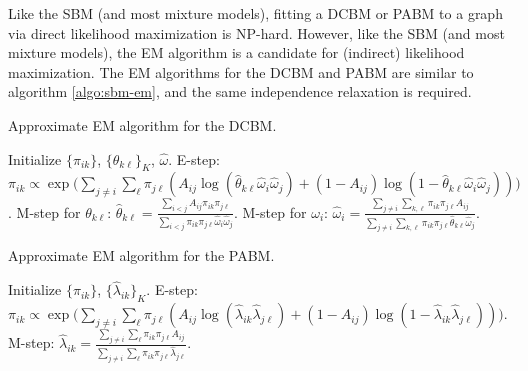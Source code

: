 \documentclass[
  12pt,
]{article}
\theoremstyle{definition}
\theoremstyle{definition}
\theoremstyle{definition}
\theoremstyle{definition}
\theoremstyle{remark}
\begin{document}
Like the SBM (and most mixture models), fitting a DCBM or PABM to a graph via direct likelihood maximization is NP-hard.
However, like the SBM (and most mixture models), the EM algorithm is a candidate for (indirect) likelihood maximization.
The EM algorithms for the DCBM and PABM are similar to algorithm \ref{algo:sbm-em}, and the same independence relaxation is required.

\begin{algorithm}
  \label{algo:dcbm-em}
  \DontPrintSemicolon
  \SetAlgoLined
  \caption{Approximate EM algorithm for the DCBM.}
  Initialize $\{\pi_{ik}\}$, $\{\theta_{k \ell}\}_K$, $\hat{\omega}$.\;
  \While{$\|\nabla \ell\| > \epsilon$} {
     {
       {
      E-step: $\pi_{ik} \propto \exp \bigg( \sum_{j \neq i} \sum_{\ell} \pi_{j \ell} (A_{ij} \log (\hat{\theta}_{k \ell} \hat{\omega}_i \hat{\omega}_j) + (1 - A_{ij}) \log (1 - \hat{\theta}_{k \ell} \hat{\omega}_i \hat{\omega}_j)) \bigg)$.\;
         {
          M-step for $\theta_{k \ell}$: $\hat{\theta}_{k \ell} = \frac{\sum_{i < j} A_{ij} \pi_{ik} \pi_{j \ell}}{\sum_{i < j} \pi_{ik} \pi_{j \ell} \hat{\omega}_i \hat{\omega}_j}$.\;
        }
      }
      M-step for $\omega_i$: $\hat{\omega}_i = \frac{\sum_{j \neq i} \sum_{k, \ell} \pi_{ik} \pi_{j \ell} A_{ij}}{\sum_{j \neq i} \sum_{k, \ell} \pi_{ik} \pi_{j \ell} \hat{\theta}_{k \ell} \hat{\omega}_j}$.\;
    }
  }
\end{algorithm}

\begin{algorithm}
  \label{algo:pabm-em}
  \DontPrintSemicolon
  \SetAlgoLined
  \caption{Approximate EM algorithm for the PABM.}
  Initialize $\{\pi_{ik}\}$, $\{\hat{\lambda}_{ik}\}_K$.\;
  \While{$\|\nabla \ell\| > \epsilon$} {
     {
       {
      E-step: $\pi_{ik} \propto \exp \bigg( \sum_{j \neq i} \sum_{\ell} \pi_{j \ell} (A_{ij} \log (\hat{\lambda}_{ik} \hat{\lambda}_{j \ell}) + (1 - A_{ij}) \log (1 - \hat{\lambda}_{ik} \hat{\lambda}_{j \ell})) \bigg)$.\;
      M-step: $\hat{\lambda}_{ik} = \frac{\sum_{j \neq i} \sum_\ell \pi_{ik} \pi_{j \ell} A_{ij}}{\sum_{j \neq i} \sum_\ell \pi_{ik} \pi_{j \ell} \hat{\lambda}_{j \ell}}$.\;
      }
    }
  }
\end{algorithm}
\end{document}
